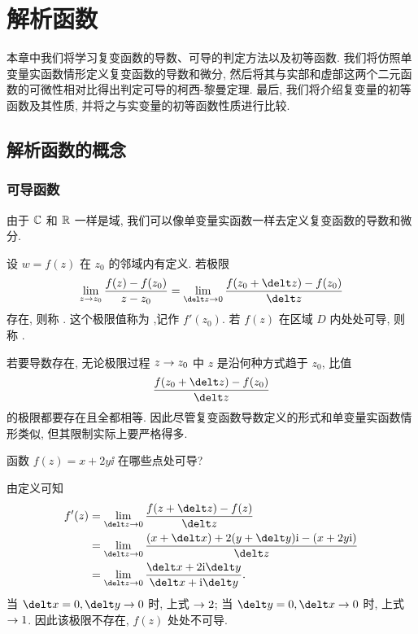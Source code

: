\chapter{解析函数}
\label{chapter:2}

本章中我们将学习复变函数的导数、可导的判定方法以及初等函数.
我们将仿照单变量实函数情形定义复变函数的导数和微分, 然后将其与实部和虚部这两个二元函数的可微性相对比得出判定可导的柯西-黎曼定理.
最后, 我们将介绍复变量的初等函数及其性质, 并将之与实变量的初等函数性质进行比较.

\section{解析函数的概念}

\subsection{可导函数}

由于 ${\mathbb{C}}$ 和 ${\mathbb{R}}$ 一样是域, 我们可以像单变量实函数一样去定义复变函数的导数和微分.

\begin{definition}
  设 $w=f(z)$ 在 $z_0$ 的邻域内有定义.
  若极限
  \[
     \lim_{z\ra z_0}\frac{f(z)-f(z_0)}{z-z_0}
    =\lim_{\delt z\ra 0}\frac{f(z_0+\delt z)-f(z_0)}{\delt z}
  \]
  存在, 则称 .
  这个极限值称为 ,记作 $f'(z_0)$.
  若 $f(z)$ 在区域 $D$ 内处处可导, 则称 .\footnotemark
\end{definition}


若要导数存在, 无论极限过程 $z\rightarrow z_0$ 中 $z$ 是沿何种方式趋于 $z_0$, 比值
\[
  \frac{f(z_0+\delt z)-f(z_0)}{\delt z}
\]
的极限都要存在且全都相等. 
因此尽管复变函数导数定义的形式和单变量实函数情形类似, 但其限制实际上要严格得多.

\begin{example}
  函数 $f(z)=x+2y\ii$ 在哪些点处可导?
\end{example}

\begin{solution}
  由定义可知
  \begin{align*}
     f'(z)&
    =\lim_{\delt z\ra 0}\frac{f(z+\delt z)-f(z)}{\delt z}\\&
    =\lim_{\delt z\ra 0}\frac{(x+\delt x)+2(y+\delt y)\ii-(x+2y\ii)}{\delt z}\\&
    =\lim_{\delt z\ra 0}\frac{\delt x+2\ii\delt y}{\delt x+\ii\delt y}.
  \end{align*}
  当 $\delt x=0, \delt y\ra 0$ 时, 上式 $\rightarrow2$; 
  当 $\delt y=0, \delt x\ra 0$ 时, 上式 $\rightarrow1$.
  因此该极限不存在, $f(z)$ 处处不可导.
\end{solution}

